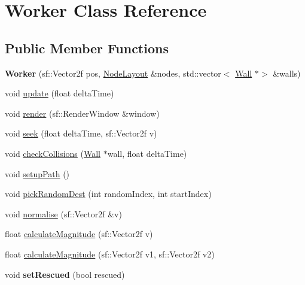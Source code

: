 \hypertarget{class_worker}{}\section{Worker Class Reference}
\label{class_worker}
\subsection*{Public Member Functions}
\begin{DoxyCompactItemize}
\item 
\mbox{\label{class_worker_abcca1d98cfe682b3c80be626f97c2fb2}} 
{\bfseries Worker} (sf\+::\+Vector2f pos, \mbox{\hyperlink{class_node_layout}{Node\+Layout}} \&nodes, std\+::vector$<$ \mbox{\hyperlink{class_wall}{Wall}} $\ast$$>$ \&walls)
\item 
void \mbox{\hyperlink{class_worker_ad79617e69aff5ed4a22835f5e2b3cf7a}{update}} (float delta\+Time)
\item 
void \mbox{\hyperlink{class_worker_a18940af5e921feefc2373e120d66ff24}{render}} (sf\+::\+Render\+Window \&window)
\item 
void \mbox{\hyperlink{class_worker_a5d3aefa5dd3ad224ac861b4d69db95ed}{seek}} (float delta\+Time, sf\+::\+Vector2f v)
\item 
void \mbox{\hyperlink{class_worker_aa28cb0d23b4fc8e4a9480bab8d4724cf}{check\+Collisions}} (\mbox{\hyperlink{class_wall}{Wall}} $\ast$wall, float delta\+Time)
\item 
void \mbox{\hyperlink{class_worker_a1d02fa53eec27493717027977ffb6c54}{setup\+Path}} ()
\item 
void \mbox{\hyperlink{class_worker_a6f0cfcb460a9bc7fa3b2f1fa5ecc8b8a}{pick\+Random\+Dest}} (int random\+Index, int start\+Index)
\item 
void \mbox{\hyperlink{class_worker_ae9b32488617a0086772afd11529e3014}{normalise}} (sf\+::\+Vector2f \&v)
\item 
float \mbox{\hyperlink{class_worker_afaf8d6984011df1daa5ef9cd53abb4cc}{calculate\+Magnitude}} (sf\+::\+Vector2f v)
\item 
float \mbox{\hyperlink{class_worker_a00fc71b506eeeef4c431c40145057306}{calculate\+Magnitude}} (sf\+::\+Vector2f v1, sf\+::\+Vector2f v2)
\item 
\mbox{\label{class_worker_a6bbf4cf7f718e3055f3fdc62a9482c58}} 
void {\bfseries set\+Rescued} (bool rescued)
\item 
$$
\end{DoxyCompactItemize}
